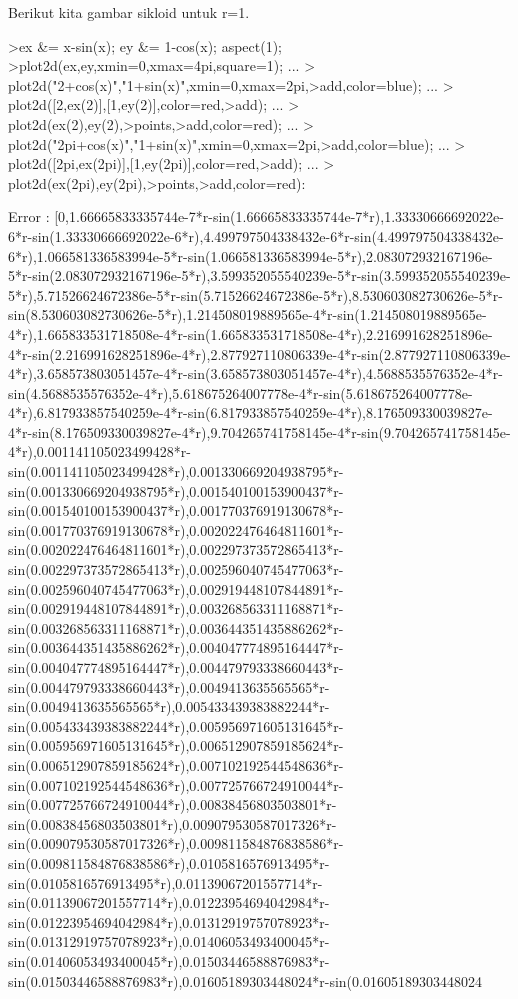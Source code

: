 \documentclass{article}
\begin{document}
\begin{eulernotebook}
\begin{eulercomment}
\begin{eulercomment}
\begin{eulercomment}
\begin{eulercomment}
\begin{eulercomment}
\begin{eulercomment}
\begin{euleroutput}
\end{euleroutput}
\begin{eulercomment}
Berikut kita gambar sikloid untuk r=1.
\end{eulercomment}
\begin{eulerprompt}
>ex &= x-sin(x); ey &= 1-cos(x); aspect(1);
>plot2d(ex,ey,xmin=0,xmax=4pi,square=1); ...
>  plot2d("2+cos(x)","1+sin(x)",xmin=0,xmax=2pi,>add,color=blue); ...
>  plot2d([2,ex(2)],[1,ey(2)],color=red,>add); ...
>  plot2d(ex(2),ey(2),>points,>add,color=red); ...
>  plot2d("2pi+cos(x)","1+sin(x)",xmin=0,xmax=2pi,>add,color=blue); ...
>  plot2d([2pi,ex(2pi)],[1,ey(2pi)],color=red,>add);  ...
>  plot2d(ex(2pi),ey(2pi),>points,>add,color=red):
\end{eulerprompt}
\begin{euleroutput}
  Error : [0,1.66665833335744e-7*r-sin(1.66665833335744e-7*r),1.33330666692022e-6*r-sin(1.33330666692022e-6*r),4.499797504338432e-6*r-sin(4.499797504338432e-6*r),1.066581336583994e-5*r-sin(1.066581336583994e-5*r),2.083072932167196e-5*r-sin(2.083072932167196e-5*r),3.599352055540239e-5*r-sin(3.599352055540239e-5*r),5.71526624672386e-5*r-sin(5.71526624672386e-5*r),8.530603082730626e-5*r-sin(8.530603082730626e-5*r),1.214508019889565e-4*r-sin(1.214508019889565e-4*r),1.665833531718508e-4*r-sin(1.665833531718508e-4*r),2.216991628251896e-4*r-sin(2.216991628251896e-4*r),2.877927110806339e-4*r-sin(2.877927110806339e-4*r),3.658573803051457e-4*r-sin(3.658573803051457e-4*r),4.5688535576352e-4*r-sin(4.5688535576352e-4*r),5.618675264007778e-4*r-sin(5.618675264007778e-4*r),6.817933857540259e-4*r-sin(6.817933857540259e-4*r),8.176509330039827e-4*r-sin(8.176509330039827e-4*r),9.704265741758145e-4*r-sin(9.704265741758145e-4*r),0.001141105023499428*r-sin(0.001141105023499428*r),0.001330669204938795*r-sin(0.001330669204938795*r),0.001540100153900437*r-sin(0.001540100153900437*r),0.001770376919130678*r-sin(0.001770376919130678*r),0.002022476464811601*r-sin(0.002022476464811601*r),0.002297373572865413*r-sin(0.002297373572865413*r),0.002596040745477063*r-sin(0.002596040745477063*r),0.002919448107844891*r-sin(0.002919448107844891*r),0.003268563311168871*r-sin(0.003268563311168871*r),0.003644351435886262*r-sin(0.003644351435886262*r),0.004047774895164447*r-sin(0.004047774895164447*r),0.004479793338660443*r-sin(0.004479793338660443*r),0.0049413635565565*r-sin(0.0049413635565565*r),0.005433439383882244*r-sin(0.005433439383882244*r),0.005956971605131645*r-sin(0.005956971605131645*r),0.006512907859185624*r-sin(0.006512907859185624*r),0.007102192544548636*r-sin(0.007102192544548636*r),0.007725766724910044*r-sin(0.007725766724910044*r),0.00838456803503801*r-sin(0.00838456803503801*r),0.009079530587017326*r-sin(0.009079530587017326*r),0.009811584876838586*r-sin(0.009811584876838586*r),0.0105816576913495*r-sin(0.0105816576913495*r),0.01139067201557714*r-sin(0.01139067201557714*r),0.01223954694042984*r-sin(0.01223954694042984*r),0.01312919757078923*r-sin(0.01312919757078923*r),0.01406053493400045*r-sin(0.01406053493400045*r),0.01503446588876983*r-sin(0.01503446588876983*r),0.01605189303448024*r-sin(0.01605189303448024
\end{euleroutput}
\end{eulercomment}
\end{eulercomment}
\end{eulercomment}
\end{eulercomment}
\end{eulercomment}
\end{eulercomment}
\end{eulernotebook}
\end{document}
